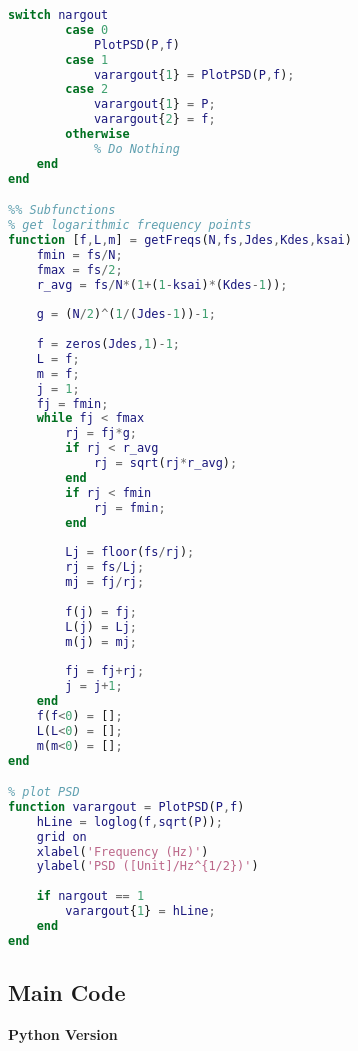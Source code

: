 \begin{lstlisting}[language=Matlab]
    switch nargout
        case 0
            PlotPSD(P,f)
        case 1
            varargout{1} = PlotPSD(P,f);
        case 2
            varargout{1} = P;
            varargout{2} = f;
        otherwise
            % Do Nothing
    end
end

%% Subfunctions
% get logarithmic frequency points
function [f,L,m] = getFreqs(N,fs,Jdes,Kdes,ksai)
    fmin = fs/N;
    fmax = fs/2;
    r_avg = fs/N*(1+(1-ksai)*(Kdes-1));
    
    g = (N/2)^(1/(Jdes-1))-1;
    
    f = zeros(Jdes,1)-1;
    L = f;
    m = f;
    j = 1;
    fj = fmin;
    while fj < fmax
        rj = fj*g;
        if rj < r_avg
            rj = sqrt(rj*r_avg);
        end
        if rj < fmin
            rj = fmin;
        end
        
        Lj = floor(fs/rj);
        rj = fs/Lj;
        mj = fj/rj;
        
        f(j) = fj;
        L(j) = Lj;
        m(j) = mj;
        
        fj = fj+rj;
        j = j+1;
    end
    f(f<0) = [];
    L(L<0) = [];
    m(m<0) = [];
end

% plot PSD
function varargout = PlotPSD(P,f)
    hLine = loglog(f,sqrt(P));
    grid on
    xlabel('Frequency (Hz)')
    ylabel('PSD ([Unit]/Hz^{1/2})')
    
    if nargout == 1
        varargout{1} = hLine;
    end
end
\end{lstlisting}





\subsection{Main Code}


{\noindent \bfseries Python Version}


